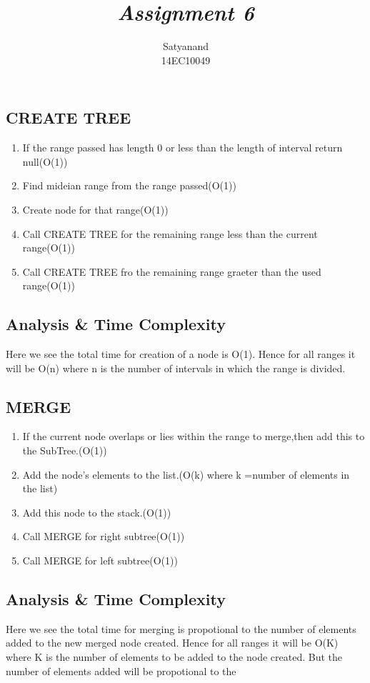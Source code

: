 \documentclass[12pt]{article}
\title{{\it Assignment 6\/} }
\author
{Satyanand\\
14EC10049
}
\date{}
\begin{document}
 
\maketitle



 

\subsection*{CREATE TREE}
\begin{enumerate}
	\item If the range passed has length 0 or less than the length of interval return null(O(1))
	\item Find mideian range from the range passed(O(1))
	\item Create node for that range(O(1))
	\item Call CREATE TREE for the remaining range less than the current range(O(1))
	\item Call CREATE TREE fro the remaining range graeter than the used range(O(1))
\end{enumerate}
\subsection*{Analysis & Time Complexity}
Here we see the total time for creation of a node is O(1). Hence for all ranges it will be O(n) where n is the number of intervals in which the range is divided.


\subsection*{MERGE}
\begin{enumerate}
	\item If the current node overlaps or lies within the range to merge,then add this to the SubTree.(O(1))
	\item Add the node's elements to the list.(O(k) where k =number of elements in the list)
	\item Add this node to the stack.(O(1))
	\item Call MERGE for right subtree(O(1))
	\item Call MERGE for left subtree(O(1))
	\end{enumerate}
\subsection*{Analysis & Time Complexity}
Here we see the total time for merging is propotional to the number of elements added to the new merged node created. Hence for all ranges it will be O(K) where K is the number of elements to be added to the node created. But the number of elements added will be propotional to the 
\end{document}
